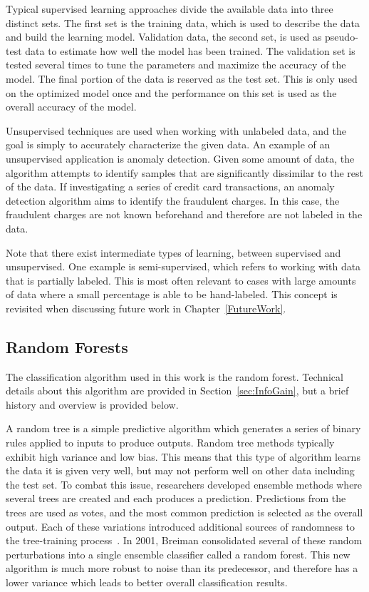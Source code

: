 \documentclass[12pt]{report}
\begin{document}
Typical supervised learning approaches divide the available data into three distinct sets.
The first set is the training data, which is used to describe the data and build the learning model.
Validation data, the second set, is used as pseudo-test data to estimate how well the model has been trained.
The validation set is tested several times to tune the parameters and maximize the accuracy of the model.
The final portion of the data is reserved as the test set.
This is only used on the optimized model once and the performance on this set is used as the overall accuracy of the model.

Unsupervised techniques are used when working with unlabeled data, and the goal is simply to accurately characterize the given data.
An example of an unsupervised application is anomaly detection.
Given some amount of data, the algorithm attempts to identify samples that are significantly dissimilar to the rest of the data.
If investigating a series of credit card transactions, an anomaly detection algorithm aims to identify the fraudulent charges.
In this case, the fraudulent charges are not known beforehand and therefore are not labeled in the data.

Note that there exist intermediate types of learning, between supervised and unsupervised.
One example is semi-supervised, which refers to working with data that is partially labeled.
This is most often relevant to cases with large amounts of data where a small percentage is able to be hand-labeled.
This concept is revisited when discussing future work in Chapter~\ref{FutureWork}.

\subsection{Random Forests}
The classification algorithm used in this work is the random forest.
Technical details about this algorithm are provided in Section~\ref{sec:InfoGain}, but a brief history and overview is provided below.

A random tree is a simple predictive algorithm which generates a series of binary rules applied to inputs to produce outputs.
Random tree methods typically exhibit high variance and low bias.
This means that this type of algorithm learns the data it is given very well, but may not perform well on other data including the test set.
To combat this issue, researchers developed ensemble methods where several trees are created and each produces a prediction.
Predictions from the trees are used as votes, and the most common prediction is selected as the overall output.
Each of these variations introduced additional sources of randomness to the tree-training process~\cite{breiman1996bagging,dietterich2000experimental,amit1997shape}.
In 2001, Breiman consolidated several of these random perturbations into a single ensemble classifier called a random forest\cite{Breiman2001}.
This new algorithm is much more robust to noise than its predecessor, and therefore has a lower variance which leads to better overall classification results.
\end{document}
